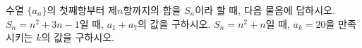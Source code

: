 수열 $\{a_n\}$의 첫째항부터 제$n$항까지의 합을 $S_n$이라 할 때, 다음 물음에 답하시오.
 $S_n=n^2+3n-1$일 때, $a_1+a_7$의 값을 구하시오.
 $S_n=n^2+n$일 때, $a_k=20$을 만족시키는 $k$의 값을 구하시오.
